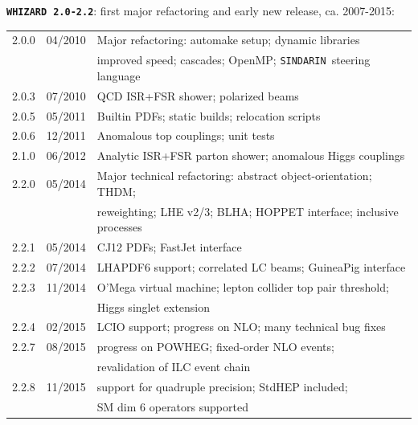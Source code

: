 \documentclass[12pt]{book}
\newcommand{\ttt}[1]{\texttt{#1}}
\newcommand{\whizard}{\ttt{WHIZARD}}
\newcommand{\sindarin}{\ttt{SINDARIN}}
\begin{document}
\vspace{2cm}

{
{\bf \whizard\ \texttt{2.0-2.2}}: first major refactoring and early new
release, ca. 2007-2015:
\nopagebreak[4]
\begin{center}
\begin{tabular}{|l|l|l|}\hline
  2.0.0 & 04/2010 & Major refactoring: automake setup; dynamic
  libraries \\
  & & improved speed; cascades; OpenMP; \sindarin\ steering language \\
  2.0.3 & 07/2010 & QCD ISR+FSR shower; polarized beams \\
  2.0.5 & 05/2011 & Builtin PDFs; static builds; relocation scripts \\
  2.0.6 & 12/2011 & Anomalous top couplings; unit tests \\\hline
  2.1.0 & 06/2012 & Analytic ISR+FSR parton shower; anomalous Higgs
  couplings \\\hline
  2.2.0 & 05/2014 & Major technical refactoring: abstract
  object-orientation; THDM; \\
  & & reweighting; LHE v2/3; BLHA; HOPPET interface; inclusive
  processes \\
  2.2.1 & 05/2014 & CJ12 PDFs; FastJet interface \\
  2.2.2 & 07/2014 & LHAPDF6 support; correlated LC beams; GuineaPig
  interface \\
  2.2.3 & 11/2014 & O'Mega virtual machine; lepton collider top
  pair threshold; \\
  & & Higgs singlet extension \\
  2.2.4 & 02/2015 & LCIO support; progress on NLO; many technical
  bug fixes \\
  2.2.7 & 08/2015 & progress on POWHEG; fixed-order NLO events; \\
  & & revalidation of ILC event chain \\
  2.2.8 & 11/2015 & support for quadruple precision; StdHEP included; \\
  & & SM dim 6 operators supported
  \\\hline
\end{tabular}
\end{center}
}

\newpage
\end{document}
